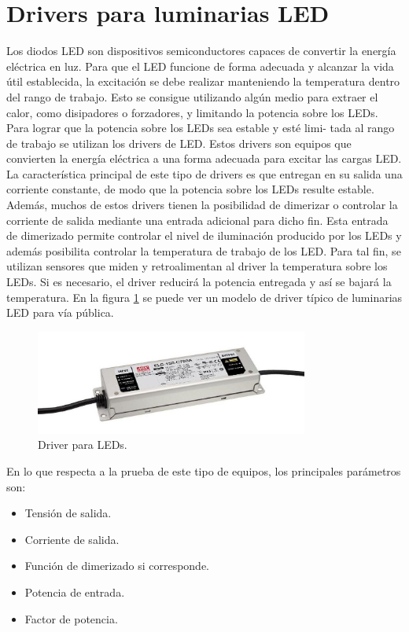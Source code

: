 \section{Drivers para luminarias LED}

Los diodos LED son dispositivos semiconductores capaces de convertir la energía eléctrica en luz. Para que el LED funcione de forma adecuada y alcanzar la vida útil establecida, la excitación se debe realizar manteniendo la temperatura dentro del rango de trabajo. Esto se consigue utilizando algún medio para extraer el calor, como disipadores o forzadores, y limitando la potencia sobre los LEDs. Para lograr que la potencia sobre los LEDs sea estable y esté limi-
tada al rango de trabajo se utilizan los drivers de LED. Estos drivers son equipos que convierten la energía eléctrica a una forma adecuada para excitar las cargas LED. La característica principal de este tipo de drivers es que entregan en su salida una corriente constante, de modo que la potencia sobre los LEDs resulte estable. Además, muchos de estos drivers tienen la posibilidad de dimerizar o controlar la corriente de salida mediante una entrada adicional para dicho fin. Esta entrada de dimerizado permite controlar el nivel de iluminación producido por los LEDs y además posibilita controlar la temperatura de trabajo de los LED. Para tal fin, se utilizan sensores que miden y retroalimentan al driver la temperatura sobre los LEDs. Si es necesario, el driver reducirá la potencia entregada y así se bajará la temperatura.
En la figura \ref{fig:Driver} se puede ver un modelo de driver típico de luminarias LED para vía pública.

\begin{figure}[H]
	\centering
	\includegraphics[width=0.8\textwidth]{./Figures/Driver.jpg}
	\caption{Driver para LEDs.\protect\footnotemark}
	\label{fig:Driver}
\end{figure}

En lo que respecta a la prueba de este tipo de equipos, los principales parámetros son:
\begin{itemize}
	\item Tensión de salida.
	\item Corriente de salida.
	\item Función de dimerizado si corresponde.
	\item Potencia de entrada.
	\item Factor de potencia.
\end{itemize}

